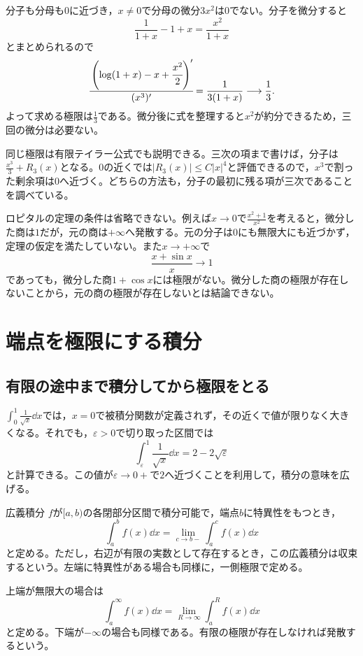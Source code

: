 分子も分母も$0$に近づき，$x\ne0$で分母の微分$3x^2$は$0$でない。分子を微分すると
\[
 \frac1{1+x}-1+x=\frac{x^2}{1+x}
\]
とまとめられるので
\[
 \cfrac{\left(\log(1+x)-x+\cfrac{x^2}{2}\right)'}{(x^3)'}
 =\frac1{3(1+x)}\longrightarrow\frac13.
\]
よって求める極限は$\frac13$である。微分後に式を整理すると$x^2$が約分できるため，三回の微分は必要ない。

同じ極限は有限テイラー公式でも説明できる。三次の項まで書けば，分子は$\frac{x^3}{3}+R_3(x)$となる。$0$の近くでは$|R_3(x)|\leq C|x|^4$と評価できるので，$x^3$で割った剰余項は$0$へ近づく。どちらの方法も，分子の最初に残る項が三次であることを調べている。

ロピタルの定理の条件は省略できない。例えば$x\to0$で$\frac{x^2+1}{x^2}$を考えると，微分した商は$1$だが，元の商は$+\infty$へ発散する。元の分子は$0$にも無限大にも近づかず，定理の仮定を満たしていない。また$x\to+\infty$で
\[
 \frac{x+\sin x}{x}\longrightarrow1
\]
であっても，微分した商$1+\cos x$には極限がない。微分した商の極限が存在しないことから，元の商の極限が存在しないとは結論できない。

\section{端点を極限にする積分}\label{節:広義積分の定義}

\subsection{有限の途中まで積分してから極限をとる}

$\int_0^1\frac1{\sqrt{x}}\dd x$では，$x=0$で被積分関数が定義されず，その近くで値が限りなく大きくなる。それでも，$\varepsilon>0$で切り取った区間では
\[
 \int_{\varepsilon}^1\frac1{\sqrt{x}}\dd x
 =2-2\sqrt{\varepsilon}
\]
と計算できる。この値が$\varepsilon\to0+$で$2$へ近づくことを利用して，積分の意味を広げる。

\begin{definition}{広義積分}
$f$が$[a,b)$の各閉部分区間で積分可能で，端点$b$に特異性をもつとき，
\[
 \int_a^bf(x)\dd x=\lim_{c\to b-}\int_a^cf(x)\dd x
\]
と定める。ただし，右辺が有限の実数として存在するとき，この広義積分は収束するという。左端に特異性がある場合も同様に，一側極限で定める。

上端が無限大の場合は
\[
 \int_a^{\infty}f(x)\dd x=\lim_{R\to\infty}\int_a^Rf(x)\dd x
\]
と定める。下端が$-\infty$の場合も同様である。有限の極限が存在しなければ発散するという。
\end{definition}

